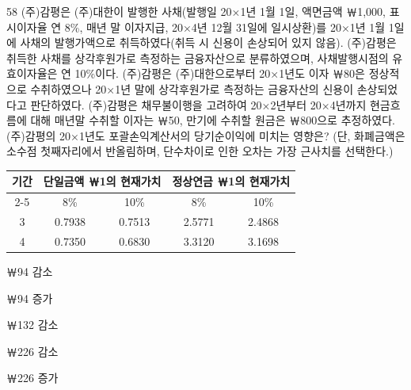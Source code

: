 \begin{question}{58}
(주)감평은 (주)대한이 발행한 사채(발행일 20×1년 1월 1일, 액면금액 ￦1,000, 표시이자율 연 8\%, 매년 말 이자지급, 20×4년 12월 31일에 일시상환)를 20×1년 1월 1일에 사채의 발행가액으로 취득하였다(취득 시 신용이 손상되어 있지 않음). (주)감평은 취득한 사채를 상각후원가로 측정하는 금융자산으로 분류하였으며, 사채발행시점의 유효이자율은 연 10\%이다. (주)감평은 (주)대한으로부터 20×1년도 이자 ￦80은 정상적으로 수취하였으나 20×1년 말에 상각후원가로 측정하는 금융자산의 신용이 손상되었다고 판단하였다. (주)감평은 채무불이행을 고려하여 20×2년부터 20×4년까지 현금흐름에 대해 매년말 수취할 이자는 ￦50, 만기에 수취할 원금은 ￦800으로 추정하였다. (주)감평의 20×1년도 포괄손익계산서의 당기순이익에 미치는 영향은? (단, 화폐금액은 소수점 첫째자리에서 반올림하며, 단수차이로 인한 오차는 가장 근사치를 선택한다.)
\par{\small\centering\begin{tabular}{|c|c|c|c|c|}\hline
\multirow{2}{*}{기간} & \multicolumn{2}{c|}{단일금액 ￦1의 현재가치} & \multicolumn{2}{c|}{정상연금 ￦1의 현재가치} \tabularnewline\cline{2-5}
 & 8\% & 10\% & 8\% & 10\% \tabularnewline\hline
3 & 0.7938 & 0.7513 & 2.5771 & 2.4868 \tabularnewline\hline
4 & 0.7350 & 0.6830 & 3.3120 & 3.1698 \tabularnewline\hline
\end{tabular}\par}
\begin{choices}
  \item ￦94 감소
  \item ￦94 증가
  \item ￦132 감소
  \item ￦226 감소
  \item ￦226 증가
\end{choices}
\end{question}
